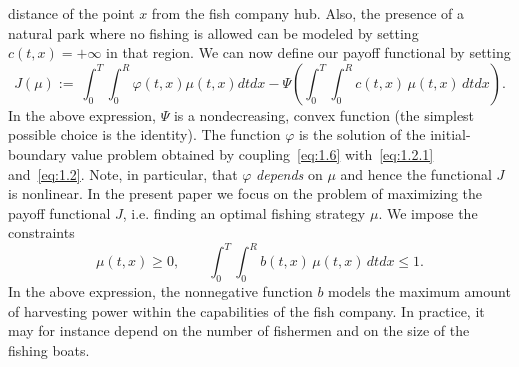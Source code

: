 \documentclass[11pt,leqno]{amsart}
\numberwithin{equation}{section}
\begin{document}
distance of
the point $x$ from the fish company hub. Also, the presence of a natural park where no fishing is allowed can be modeled by setting  $c(t,x)=+\infty$ in that region. 
We can now define our payoff functional by setting 
\begin{equation}
  \label{e:cosaepayoff}
  J( \mu):=~\int_0^T \! \! \int_0^R {\varphi}(t,x)\mu(t,x)dtdx-
  \Psi\left(\int_0^T \! \! \int_0^R c(t,x)\,\mu(t,x)\,dtdx\right).
\end{equation}
In the above expression, $\Psi$ is a nondecreasing, convex function (the simplest possible choice is the identity). The function ${\varphi}$ is the solution of the initial-boundary value problem obtained by coupling~\eqref{eq:1.6} with~\eqref{eq:1.2.1} and~\eqref{eq:1.2}. Note, in particular, that ${\varphi}$ \emph{depends} on $\mu$ and hence the functional $J$ is nonlinear. In the present paper we focus on the problem of maximizing the payoff functional $J$, i.e. finding an optimal fishing strategy $\mu$. We impose the constraints 
\begin{equation}
\label{eq:1.9}
\mu(t,x) \geq 0,\qquad  
\int_0^T
\! \! \int_0^R b(t,x)\, \mu(t,x)\,dtdx \leq 1.
\end{equation}
In the above expression, the nonnegative function $b$
models the maximum amount 
of harvesting power
within the capabilities of the fish company.
In practice, it may for instance depend on the number of fishermen
and on the size of the fishing boats.
\end{document}
